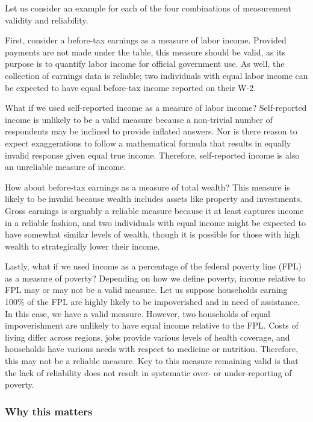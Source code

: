 \documentclass[
]{book}
\begin{document}
Let us consider an example for each of the four combinations of measurement validity and reliability.

First, consider a before-tax earnings as a measure of labor income. Provided payments are not made under the table, this measure should be valid, as its purpose is to quantify labor income for official government use. As well, the collection of earnings data is reliable; two individuals with equal labor income can be expected to have equal before-tax income reported on their W-2.

What if we used self-reported income as a measure of labor income? Self-reported income is unlikely to be a valid measure because a non-trivial number of respondents may be inclined to provide inflated answers. Nor is there reason to expect exaggerations to follow a mathematical formula that results in equally invalid response given equal true income. Therefore, self-reported income is also an unreliable measure of income.

How about before-tax earnings as a measure of total wealth? This measure is likely to be invalid because wealth includes assets like property and investments. Gross earnings is arguably a reliable measure because it at least captures income in a reliable fashion, and two individuals with equal income might be expected to have somewhat similar levels of wealth, though it is possible for those with high wealth to strategically lower their income.

Lastly, what if we used income as a percentage of the federal poverty line (FPL) as a measure of poverty? Depending on how we define poverty, income relative to FPL may or may not be a valid measure. Let us suppose households earning 100\% of the FPL are highly likely to be impoverished and in need of assistance. In this case, we have a valid measure. However, two households of equal impoverishment are unlikely to have equal income relative to the FPL. Costs of living differ across regions, jobs provide various levels of health coverage, and households have various needs with respect to medicine or nutrition. Therefore, this may not be a reliable measure. Key to this measure remaining valid is that the lack of reliability does not result in systematic over- or under-reporting of poverty.

\hypertarget{why-this-matters}{%
\subsubsection{Why this matters}\label{why-this-matters}}
\end{document}
